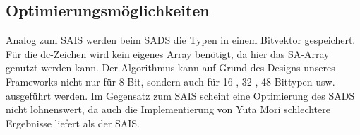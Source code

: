 \subsection{Optimierungsmöglichkeiten}
Analog zum SAIS werden beim SADS die Typen in einem Bitvektor gespeichert. Für die dc-Zeichen wird kein eigenes Array benötigt, da hier das SA-Array genutzt werden kann. Der Algorithmus kann auf Grund des Designs unseres Frameworks nicht nur für 8-Bit, sondern auch für 16-, 32-, 48-Bittypen usw. ausgeführt werden. Im Gegensatz zum SAIS scheint eine Optimierung des SADS nicht lohnenswert, da auch die Implementierung von Yuta Mori schlechtere Ergebnisse liefert als der SAIS.
 \newpage





























